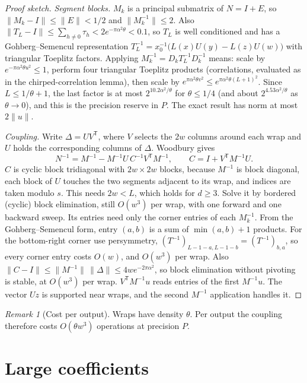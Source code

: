 \documentclass[11pt]{article}
\theoremstyle{remark}\newtheorem*{remark}{Remark}
\begin{document}
\begin{proof}[Proof sketch]
\emph{Segment blocks.} $M_k$ is a principal submatrix of $N=I+E$, so
$\|M_k-I\|\le\|E\|<1/2$ and $\|M_k^{-1}\|\le2$. Also
$\|T_L-I\|\le\sum_{h\ne0}\tau_h<2e^{-\pi\alpha^2\theta}<0.1$, so $T_L$ is well conditioned
and has a Gohberg--Semencul representation
$T_L^{-1}=x_0^{-1}\bigl(L(x)U(y)-L(z)U(w)\bigr)$ with triangular Toeplitz factors.
Applying $M_k^{-1}=D_kT_L^{-1}D_k^{-1}$ means: scale by
$e^{-\pi\alpha^2\theta u^2}\le1$, perform four triangular Toeplitz products (correlations,
evaluated as in the chirped-correlation lemma), then scale by
$e^{\pi\alpha^2\theta v^2}\le e^{\pi\alpha^2\theta(L+1)^2}$. Since $L\le1/\theta+1$, the
last factor is at most $2^{10.2\alpha^2/\theta}$ for $\theta\le1/4$ (and about $2^{4.53\alpha^2/\theta}$ as $\theta\to0$), and this is the precision
reserve in $P$. The exact result has norm at most $2\|u\|$.

\emph{Coupling.} Write $\Delta=UV^{\mathsf T}$, where $V$ selects the $2w$ columns
around each wrap and $U$ holds the corresponding columns of $\Delta$. Woodbury gives
\[
 N^{-1}=M^{-1}-M^{-1}U\,C^{-1}V^{\mathsf T}M^{-1},\qquad C=I+V^{\mathsf T}M^{-1}U .
\]
$C$ is cyclic block tridiagonal with $2w\times2w$ blocks, because $M^{-1}$ is block diagonal, each block of $U$ touches the two segments adjacent to its wrap, and indices are taken modulo $s$. This needs $2w<L$, which holds for $d\ge3$. Solve it by bordered (cyclic) block elimination, still $O(w^3)$ per wrap, with one forward and one backward sweep. Its entries need only
the corner entries of each $M_k^{-1}$. From the Gohberg--Semencul form, entry $(a,b)$ is a sum of $\min(a,b)+1$ products. For the bottom-right corner use persymmetry, $(T^{-1})_{L-1-a,L-1-b}=(T^{-1})_{b,a}$, so every corner entry costs $O(w)$, and $O(w^3)$ per wrap. Also
$\|C-I\|\le\|M^{-1}\|\,\|\Delta\|\le4we^{-2\pi\alpha^2}$, so block elimination without
pivoting is stable, at $O(w^3)$ per wrap.
$V^{\mathsf T}M^{-1}u$ reads entries of the first $M^{-1}u$. The vector $Uz$ is supported
near wraps, and the second $M^{-1}$ application handles it.
\end{proof}

\begin{remark}[Cost per output]
Wraps have density $\theta$. Per output the coupling therefore costs
$O(\theta w^3)$ operations at precision $P$.
\end{remark}

\section{Large coefficients}
\end{document}
